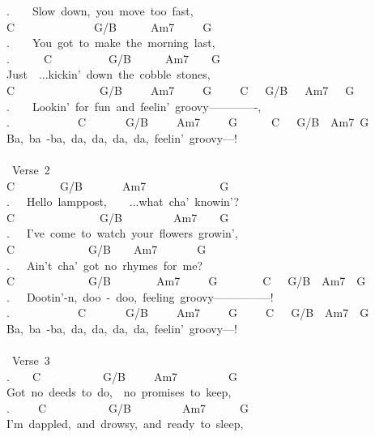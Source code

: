 {.\ \ \ \ Slow\ down,\ you\ move\ too\ fast,\\
C\ \ \ \ \ \ \ \ \ \ \ \ \ \ G/B\ \ \ \ \ \ Am7\ \ \ \ \ G\\
.\ \ \ \ You\ got\ to\ make\ the\ morning\ last,\\
.\ \ \ \ \ \ C\ \ \ \ \ \ \ \ \ \ G/B\ \ \ \ \ \ Am7\ \ \ \ G\\
Just\ \ ...kickin'\ down\ the\ cobble\ stones,\\
C\ \ \ \ \ \ \ \ \ \ \ \ \ \ \ G/B\ \ \ \ \ Am7\ \ \ \ \ G\ \ \ \ \ C\ \ \ G/B\ \ \ Am7\ \ \ G\\
.\ \ \ \ Lookin'\ for\ fun\ and\ feelin'\ groovy-------------,\\
.\ \ \ \ \ \ \ \ \ \ \ \ C\ \ \ \ \ \ \ G/B\ \ \ \ \ Am7\ \ \ \ \ G\ \ \ \ \ \ C\ \ \ G/B\ \ Am7\ G\\
Ba,\ ba\ -ba,\ da,\ da,\ da,\ da,\ feelin'\ groovy---!\\
\\
\lbrack\ Verse\ 2\rbrack\\
C\ \ \ \ \ \ \ \ G/B\ \ \ \ \ \ \ Am7\ \ \ \ \ \ \ \ \ \ \ \ \ G\\
.\ \ \ Hello\ lamppost,\ \ \ \ ...what\ cha'\ knowin'?\\
C\ \ \ \ \ \ \ \ \ \ \ \ \ \ \ G/B\ \ \ \ \ \ \ \ \ Am7\ \ \ \ G\\
.\ \ \ I've\ come\ to\ watch\ your\ flowers\ growin',\\
C\ \ \ \ \ \ \ \ \ \ \ \ \ G/B\ \ \ \ Am7\ \ \ \ \ \ \ G\\
.\ \ \ Ain't\ cha'\ got\ no\ rhymes\ for\ me?\\
C\ \ \ \ \ \ \ \ \ \ \ \ \ G/B\ \ \ \ \ \ \ \ Am7\ \ \ \ \ G\ \ \ \ \ \ \ \ C\ \ \ G/B\ \ Am7\ \ G\\
.\ \ \ Dootin'-n,\ doo\ -\ doo,\ feeling\ groovy---------------!\\
.\ \ \ \ \ \ \ \ \ \ \ \ C\ \ \ \ \ \ \ G/B\ \ \ \ \ Am7\ \ \ \ \ G\ \ \ \ \ C\ \ \ G/B\ \ Am7\ \ G\\
Ba,\ ba\ -ba,\ da,\ da,\ da,\ da,\ feelin'\ groovy---!\\
\\
\lbrack\ Verse\ 3\rbrack\\
.\ \ \ \ C\ \ \ \ \ \ \ \ \ \ \ G/B\ \ \ \ \ Am7\ \ \ \ \ \ \ \ \ G\\
Got\ no\ deeds\ to\ do,\ \ no\ promises\ to\ keep,\\
.\ \ \ \ \ C\ \ \ \ \ \ \ \ \ \ \ G/B\ \ \ \ \ \ \ \ \ Am7\ \ \ \ \ \ G\\
I'm\ dappled,\ and\ drowsy,\ and\ ready\ to\ sleep,\\
}
